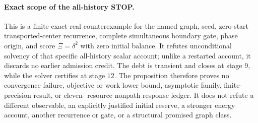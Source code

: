 \paragraph{Exact scope of the all-history STOP.}
This is a finite exact-real counterexample for the named graph, seed,
zero-start transported-center recurrence, complete simultaneous boundary
gate, phase origin, and score $\Xi=\delta^2$ with zero initial balance.  It
refutes unconditional solvency of that specific all-history scalar account;
unlike a restarted account, it discards no earlier admission credit.  The
debt is transient and closes at stage $9$, while the solver certifies at stage
$12$.  The proposition therefore proves no convergence failure, objective or
work lower bound, asymptotic family, finite-precision result, or eleven-
resource nonpath response ledger.  It does not refute a different observable,
an explicitly justified initial reserve, a stronger energy account, another
recurrence or gate, or a structural promised graph class.

